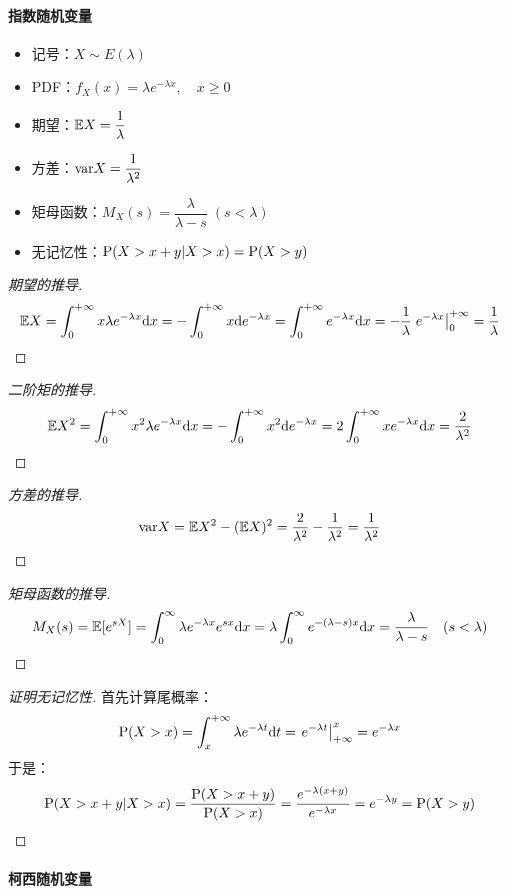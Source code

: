 \paragraph{指数随机变量}

\begin{itemize}[itemsep=1ex]
    \item 记号：$X\sim E(\lambda)$
    \item PDF：$f_X(x)=\lambda e^{-\lambda x},\quad x\geqslant0$
    \item 期望：$\mathbb{E} X=\dfrac{1}{\lambda}$
    \item 方差：$\mathrm{var} X=\dfrac{1}{\lambda^2}$
    \item 矩母函数：$M_X(s)=\dfrac{\lambda}{\lambda-s}\;(s<\lambda)$
    \item 无记忆性：$\mathrm{P}(X>x+y\vert X>x)=\mathrm{P}(X>y)$
\end{itemize}

\begin{proof}[期望的推导]
\[
\mathbb{E} X=\int_0^{+\infty}x\lambda e^{-\lambda x}\mathrm dx=-\int_0^{+\infty}x\mathrm d e^{-\lambda x}=\int_0^{+\infty}e^{-\lambda x}\mathrm dx=-\frac{1}{\lambda}\left.e^{-\lambda x}\right|_{0}^{+\infty}=\frac{1}{\lambda}
\]
\end{proof}
\begin{proof}[二阶矩的推导]
\[
\mathbb{E} X^2=\int_0^{+\infty} x^2\lambda e^{-\lambda x}\mathrm dx=-\int_0^{+\infty}x^2\mathrm de^{-\lambda x}=2\int_0^{+\infty}x e^{-\lambda x}\mathrm dx=\frac{2}{\lambda^2}
\]
\end{proof}
\begin{proof}[方差的推导]
\[
\mathrm{var} X=\mathbb{E} X^2-(\mathbb{E} X)^2=\frac{2}{\lambda^2}-\frac{1}{\lambda^2}=\frac{1}{\lambda^2}
\]
\end{proof}
\begin{proof}[矩母函数的推导]
\[
M_X(s)=\mathbb{E}[e^{sX}]=\int_0^\infty\lambda e^{-\lambda x}e^{sx}\mathrm dx=\lambda\int_0^\infty e^{-(\lambda-s)x}\mathrm dx=\frac{\lambda}{\lambda-s}\quad(s<\lambda)
\]
\end{proof}
\begin{proof}[证明无记忆性]
首先计算尾概率：
\[
\mathrm{P}(X>x)=\int_x^{+\infty}\lambda e^{-\lambda t}\mathrm dt=\left.e^{-\lambda t}\right|_{+\infty}^x=e^{-\lambda x}
\]
于是：
\[
\mathrm{P}(X>x+y\vert X>x)=\frac{\mathrm{P}(X>x+y)}{\mathrm{P}(X>x)}=\frac{e^{-\lambda(x+y)}}{e^{-\lambda x}}=e^{-\lambda y}=\mathrm{P}(X>y)
\]
\end{proof}

\paragraph{柯西随机变量}


